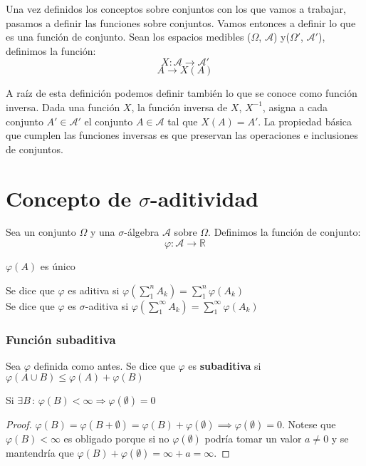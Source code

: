 \documentclass[12pt,a4paper]{book}
\begin{document}
Una vez definidos los conceptos sobre conjuntos con los que vamos a trabajar, pasamos a definir las funciones sobre conjuntos. Vamos entonces a definir lo que es una función de conjunto. Sean los espacios medibles ($\Omega$, $\mathcal{A}$) y($\Omega'$, $\mathcal{A}'$), definimos la función:
$$ X: \mathcal{A} \to \mathcal{A}'$$
$$ A \longrightarrow X(A)$$

A raíz de esta definición podemos definir también lo que se conoce como función inversa. Dada una función $X$, la función inversa de $X$, $X^{-1}$, asigna a cada conjunto $A' \in \mathcal{A}'$ el conjunto $A \in \mathcal{A}$ tal que $X(A) = A'$. La propiedad básica que cumplen las funciones inversas es que preservan las operaciones e inclusiones de conjuntos.

\section{Concepto de $\sigma$-aditividad}
Sea un conjunto $\Omega$ y una $\sigma$-álgebra $\mathcal{A}$ sobre $\Omega$. Definimos la función de conjunto:
$$\varphi : \mathcal{A} \rightarrow \mathbb{R}$$
\begin{center}
$\varphi (A)$ es único\\
\end{center}
Se dice que $\varphi$ es aditiva si $\varphi\left(\displaystyle\sum_{1}^{n}A_k\right)=\displaystyle\sum_1^n\varphi(A_k)$\\
Se dice que $\varphi$ es $\sigma$-aditiva si $\varphi\left(\displaystyle\sum_1^\infty A_k\right)=\displaystyle\sum_1^\infty \varphi(A_k)$


\subsubsection{Función subaditiva}
Sea $\varphi$ definida como antes. Se dice que $\varphi$ es \textbf{subaditiva} si $\varphi(A \cup B) \leq \varphi(A) + \varphi(B)$

\begin{lemma}
Si $\exists B\, : \, \varphi(B)<\infty \Rightarrow \varphi(\emptyset)=0$
\end{lemma}
\begin{proof}
	$\varphi(B) =  \varphi(B+\emptyset) = \varphi(B) + \varphi(\emptyset)\implies \varphi(\emptyset) = 0$. Notese que $\varphi(B)<\infty$ es obligado porque si no $\varphi(\emptyset)$ podría tomar un valor $a \neq 0$ y se mantendría que  $\varphi(B) + \varphi(\emptyset) = \infty + a = \infty$.
\end{proof}
\end{document}
